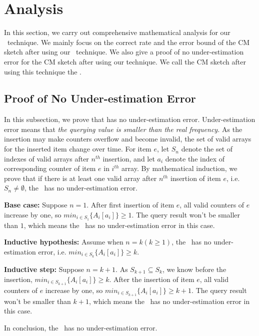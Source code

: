 \presec
\section{Analysis} \postsec

In this section, we carry out comprehensive mathematical analysis for our \aname~technique.
We mainly focus on the correct rate and the error bound of the CM sketch after using our \aname~technique.
We also give a proof of no under-estimation error for the CM sketch after using our technique.
We call the CM sketch after using this technique the \ccm.

\presub
\subsection{Proof of No Under-estimation Error} \postsub

In this subsection, we prove that \ccm has no under-estimation error. Under-estimation error means that \emph{the querying value is smaller than the real frequency.} 
As the insertion may make counters overflow and become invalid, the set of valid arrays for the inserted item change over time. 
For item $e$, let $S_n$ denote the set of indexes of valid arrays after $n^{th}$ insertion, and let $a_i$ denote the index of corresponding counter of item $e$ in $i^{th}$ array.
By mathematical induction, we prove that if there is at least one valid array after $n^{th}$ insertion of item $e$, i.e. $S_n \neq \emptyset$, the \ccm~has no under-estimation error.

\noindent\textbf{Base case: } Suppose $n = 1$. 
After first insertion of item $e$, all valid counters of $e$ increase by one, so $min_{i\in S_1}\{A_i[a_i]\} \ge 1$. 
The query result won't be smaller than $1$, which means the \ccm~has no under-estimation error in this case. 

\noindent\textbf{Inductive hypothesis: } Assume when $n = k (k \ge 1)$, the \ccm~has no under-estimation error, i.e. $min_{i\in S_k}\{A_i[a_i]\} \ge k$.

\noindent\textbf{Inductive step: } Suppose $n = k + 1$. 
As $S_{k+1}\subseteq S_k$, we know before the insertion, $min_{i\in S_{k+1}}\{A_i[a_i]\} \ge k$. After the insertion of item $e$, all valid counters of $e$ increase by one, so $min_{i\in S_{k+1}}\{A_i[a_i]\} \ge k+1$. 
The query result won't be smaller than $k+1$, which means the \ccm~has no under-estimation error in this case. 

In conclusion, the \ccm~has no under-estimation error.

